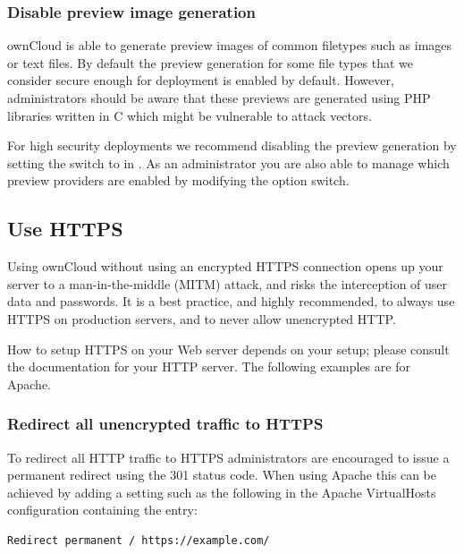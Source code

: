 \documentclass[letterpaper,10pt,english]{sphinxmanual}
\begin{document}
\subsubsection{Disable preview image generation}
\label{configuration_server/harden_server:disable-preview-image-generation}
ownCloud is able to generate preview images of common filetypes such as images
or text files. By default the preview generation for some file types that we
consider secure enough for deployment is enabled by default. However,
administrators should be aware that these previews are generated using PHP
libraries written in C which might be vulnerable to attack vectors.

For high security deployments we recommend disabling the preview generation by
setting the  switch to  in . As an
administrator you are also able to manage which preview providers are enabled by
modifying the  option switch.


\subsection{Use HTTPS}
\label{configuration_server/harden_server:use-https}\label{configuration_server/harden_server:use-https-label}
Using ownCloud without using an encrypted HTTPS connection opens up your server
to a man-in-the-middle (MITM) attack, and risks the interception of user data
and passwords. It is a best practice, and highly recommended, to always use
HTTPS on production servers, and to never allow unencrypted HTTP.

How to setup HTTPS on your Web server depends on your setup; please consult the
documentation for your HTTP server. The following examples are for Apache.


\subsubsection{Redirect all unencrypted traffic to HTTPS}
\label{configuration_server/harden_server:redirect-all-unencrypted-traffic-to-https}
To redirect all HTTP traffic to HTTPS administrators are encouraged to issue a
permanent redirect using the 301 status code. When using Apache this can be
achieved by adding a setting such as the following in the Apache VirtualHosts
configuration containing the  entry:

\begin{Verbatim}[commandchars=\\\{\}]
Redirect permanent / https://example.com/
\end{Verbatim}
\end{document}
